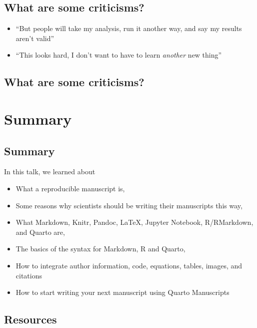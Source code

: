 \documentclass[
  letterpaper,
  DIV=11,
  numbers=noendperiod]{scrartcl}
\providecommand{\tightlist}{%
  \setlength{\itemsep}{0pt}\setlength{\parskip}{0pt}}\usepackage{longtable,booktabs,array}
\begin{document}
\subsection{What are some criticisms?}\label{what-are-some-criticisms}

\begin{itemize}
\tightlist
\item
  ``But people will take my analysis, run it another way, and say my
  results aren't valid''
\item
  ``This looks hard, I don't want to have to learn \emph{another} new
  thing''
\end{itemize}

\subsection{What are some criticisms?}\label{what-are-some-criticisms-1}

\section{Summary}\label{summary}

\subsection{Summary}\label{summary-1}

In this talk, we learned about

\begin{itemize}
\tightlist
\item
  What a reproducible manuscript is,
\item
  Some reasons why scientists should be writing their manuscripts this
  way,
\item
  What Markdown, Knitr, Pandoc, LaTeX, Jupyter Notebook, R/RMarkdown,
  and Quarto are,
\item
  The basics of the syntax for Markdown, R and Quarto,
\item
  How to integrate author information, code, equations, tables, images,
  and citations
\item
  How to start writing your next manuscript using Quarto Manuscripts
\end{itemize}

\subsection{Resources}\label{resources}
\end{document}
